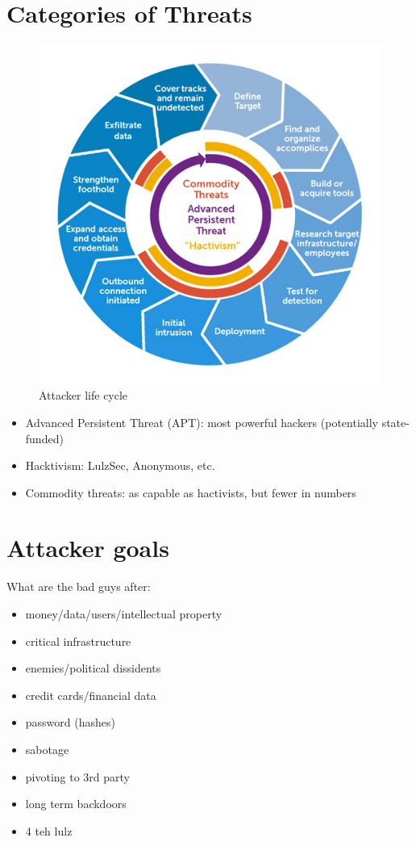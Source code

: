 \documentclass[letterpaper]{article}
\begin{document}
\section{Categories of Threats}
\begin{figure}
\centering
\includegraphics[scale=0.5]{Advanced_persistent_threat_lifecycle.jpg}
\caption{Attacker life cycle}
\end{figure}

\begin{itemize}
\item Advanced Persistent Threat (APT): most powerful hackers (potentially state-funded)
\item Hacktivism: LulzSec, Anonymous, etc.
\item Commodity threats: as capable as hactivists, but fewer in numbers
\end{itemize}

\section{Attacker goals}
What are the bad guys after:
\begin{itemize}
\item money/data/users/intellectual property
\item critical infrastructure
\item enemies/political dissidents
\item credit cards/financial data
\item password (hashes)
\item sabotage
\item pivoting to 3rd party
\item long term backdoors
\item 4 teh lulz
\end{itemize}
\end{document}
